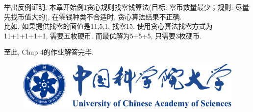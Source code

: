 \documentclass{article}
\begin{document}
\pagebreak


\begin{homeworkProblem}
	举出反例证明: 本章开始例1贪心规则找零钱算法(目标: 零币数量最少；规则: 尽量先找币值大的), 在零钱种类不合适时, 贪心算法结果不正确.
	\\

	\solution 比如, 如果提供找零的面值是11,5,1, 找零15.
	使用贪心算法找零方式为11+1+1+1+1, 需要五枚硬币. 而最优解为5+5+5, 只需要3枚硬币.
\end{homeworkProblem}

\vspace{5cm}

至此, Chap 4的作业解答完毕.

\vspace{5cm}

\begin{figure}[H]  %
	\centering
	\includegraphics[width=0.7\linewidth]{images/title/ucas_logo 1.pdf}
	\label{fig:ucas-logo}
\end{figure}



\end{document}
